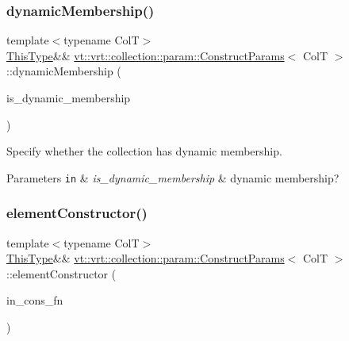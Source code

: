 \subsubsection{\texorpdfstring{dynamic\+Membership()}{dynamicMembership()}}
{\footnotesize\ttfamily template$<$typename ColT$>$ \\
\hyperlink{structvt_1_1vrt_1_1collection_1_1param_1_1_construct_params_a13d4910c0f6825c7b0ddfebce5288bea}{This\+Type}\&\& \hyperlink{structvt_1_1vrt_1_1collection_1_1param_1_1_construct_params}{vt\+::vrt\+::collection\+::param\+::\+Construct\+Params}$<$ ColT $>$\+::dynamic\+Membership (\begin{DoxyParamCaption}\item[{bool}]{is\+\_\+dynamic\+\_\+membership }\end{DoxyParamCaption})\hspace{0.3cm}{\ttfamily [inline]}}



Specify whether the collection has dynamic membership. 


\begin{DoxyParams}[1]{Parameters}
\mbox{\tt in}  & {\em is\+\_\+dynamic\+\_\+membership} & dynamic membership? \\
\hline
\end{DoxyParams}
\mbox{\label{structvt_1_1vrt_1_1collection_1_1param_1_1_construct_params_a1a9710ed590f69867feccae0f432b724}} 
\subsubsection{\texorpdfstring{element\+Constructor()}{elementConstructor()}}
{\footnotesize\ttfamily template$<$typename ColT$>$ \\
\hyperlink{structvt_1_1vrt_1_1collection_1_1param_1_1_construct_params_a13d4910c0f6825c7b0ddfebce5288bea}{This\+Type}\&\& \hyperlink{structvt_1_1vrt_1_1collection_1_1param_1_1_construct_params}{vt\+::vrt\+::collection\+::param\+::\+Construct\+Params}$<$ ColT $>$\+::element\+Constructor (\begin{DoxyParamCaption}\item[{\hyperlink{structvt_1_1vrt_1_1collection_1_1param_1_1_construct_params_a7ad7bdf4220701e54b485f45e08b1736}{Construct\+Fn\+Type}}]{in\+\_\+cons\+\_\+fn }\end{DoxyParamCaption})\hspace{0.3cm}{\ttfamily [inline]}}



